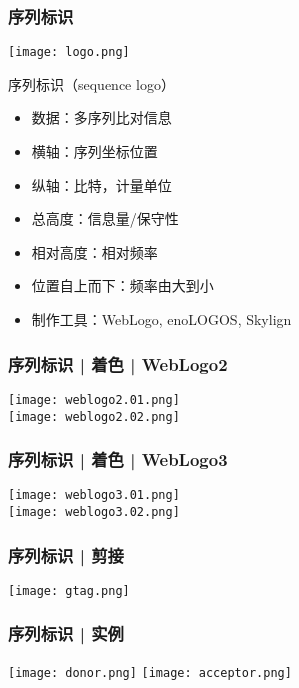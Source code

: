 \begin{frame}
  \frametitle{\alert{序列标识}}
  \begin{center}
    \texttt{[image: logo.png]}
  \end{center}
  \pause
  \begin{block}{序列标识（sequence logo）}
    \begin{itemize}
      \item 数据：多序列比对信息
      \item 横轴：序列坐标位置
      \item 纵轴：比特，计量单位
      \item 总高度：信息量/保守性
      \item 相对高度：相对频率
      \item 位置自上而下：频率由大到小
      \item 制作工具：WebLogo, enoLOGOS, Skylign
    \end{itemize}
  \end{block}
\end{frame}

\begin{frame}
  \frametitle{序列标识 | 着色 | WebLogo2}
  \begin{center}
    \texttt{[image: weblogo2.01.png]}\\
    \vspace{1em}
    \texttt{[image: weblogo2.02.png]}
  \end{center}
\end{frame}

\begin{frame}
  \frametitle{序列标识 | 着色 | WebLogo3}
  \begin{center}
    \texttt{[image: weblogo3.01.png]}\\
    \vspace{1em}
    \texttt{[image: weblogo3.02.png]}
  \end{center}
\end{frame}

\begin{frame}
  \frametitle{序列标识 | 剪接}
  \begin{center}
    \texttt{[image: gtag.png]}
  \end{center}
\end{frame}

\begin{frame}
  \frametitle{序列标识 | 实例}
  \begin{center}
    \texttt{[image: donor.png]}
    \vspace{0.5cm}
    \texttt{[image: acceptor.png]}
  \end{center}
\end{frame}

